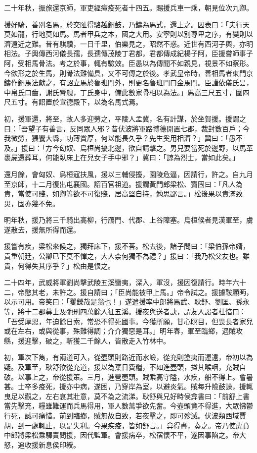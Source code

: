 \begin{pinyinscope}
二十年秋，振旅還京師，軍吏經瘴疫死者十四五。賜援兵車一乘，朝見位次九卿。

援好騎，善別名馬，於交阯得駱越銅鼓，乃鑄為馬式，還上之。因表曰：「夫行天莫如龍，行地莫如馬。馬者甲兵之本，國之大用。安寧則以別尊卑之序，有變則以濟遠近之難。昔有騏驥，一日千里，伯樂見之，昭然不惑。近世有西河子輿，亦明相法。子輿傳西河儀長孺，長孺傳茂陵丁君都，君都傳成紀楊子阿，臣援嘗師事子阿，受相馬骨法。考之於事，輒有驗效。臣愚以為傳聞不如親見，視景不如察形。今欲形之於生馬，則骨法難備具，又不可傳之於後。孝武皇帝時，善相馬者東門京鑄作銅馬法獻之，有詔立馬於魯班門外，則更名魯班門曰金馬門。臣謹依儀氏昙，中帛氏口齒，謝氏脣舰，丁氏身中，備此數家骨相以為法。」馬高三尺五寸，圍四尺五寸。有詔置於宣德殿下，以為名馬式焉。

初，援軍還，將至，故人多迎勞之，平陵人孟冀，名有計謀，於坐賀援。援謂之曰：「吾望子有善言，反同眾人邪？昔伏波將軍路博德開置七郡，裁封數百戶；今我微勞，猥饗大縣，功薄賞厚，何以能長久乎？先生奚用相濟？」冀曰：「愚不及。」援曰：「方今匈奴、烏桓尚擾北邊，欲自請擊之。男兒要當死於邊野，以馬革裹屍還葬耳，何能臥床上在兒女子手中邪？」冀曰：「諒為烈士，當如此矣。」

還月餘，會匈奴、烏桓寇扶風，援以三輔侵擾，園陵危逼，因請行，許之。自九月至京師，十二月復出屯襄國。詔百官祖道。援謂黃門郎梁松、竇固曰：「凡人為貴，當使可賤，如卿等欲不可復賤，居高堅自持，勉思鄙言。」松後果以貴滿致災，固亦幾不免。

明年秋，援乃將三千騎出高柳，行鴈門、代郡、上谷障塞。烏桓候者見漢軍至，虜遂散去，援無所得而還。

援嘗有疾，梁松來候之，獨拜床下，援不荅。松去後，諸子問曰：「梁伯孫帝婿，貴重朝廷，公卿已下莫不憚之，大人柰何獨不為禮？」援曰：「我乃松父友也。雖貴，何得失其序乎？」松由是恨之。

二十四年，武威將軍劉尚擊武陵五溪蠻夷，深入，軍沒，援因復請行。時年六十二，帝愍其老，未許之。援自請曰；「臣尚能被甲上馬。」帝令試之。援據鞍顧眄，以示可用。帝笑曰：「矍鑠哉是翁也！」遂遣援率中郎將馬武、耿舒、劉匡、孫永等，將十二郡募士及弛刑四萬餘人征五溪。援夜與送者訣，謂友人謁者杜愔曰：「吾受厚恩，年迫餘日索，常恐不得死國事。今獲所願，甘心瞑目，但畏長者家兒或在左右，或與從事，殊難得調；介介獨惡是耳。」明年春，軍至臨鄉，遇賊攻縣，援迎擊，破之，斬獲二千餘人，皆散走入竹林中。

初，軍次下雋，有兩道可入，從壺頭則路近而水嶮，從充則塗夷而運遠，帝初以為疑。及軍至，耿舒欲從充道，援以為棄日費糧，不如進壺頭，搤其喉咽，充賊自破。以事上之，帝從援策。三月，進營壺頭。賊乘高守隘，水疾，船不得上。會暑甚。士卒多疫死，援亦中病，遂困，乃穿岸為室，以避炎氣。賊每升險鼓譟，援輒曳足以觀之，左右哀其壯意，莫不為之流涕。耿舒與兄好畤侯弇書曰：「前舒上書當先擊充，糧雖難運而兵馬得用，軍人數萬爭欲先奮。今壺頭竟不得進，大眾怫鬱行死，誠可痛惜。前到臨鄉，賊無故自致，若夜擊之，即可殄滅。伏波類西域賈胡，到一處輒止，以是失利。今果疾疫，皆如舒言。」弇得書，奏之。帝乃使虎賁中郎將梁松乘驛責問援，因代監軍。會援病卒，松宿懷不平，遂因事陷之。帝大怒，追收援新息侯印綬。


\end{pinyinscope}
